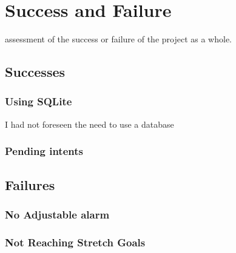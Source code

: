 \section{Success and Failure}\label{success-and-failure}

assessment of the success or failure of the project as a whole.

\subsection{Successes}\label{successes}

\subsubsection{Using SQLite}\label{using-sqlite}

I had not foreseen the need to use a database

\subsubsection{Pending intents}\label{pending-intents}

\subsection{Failures}\label{failures}

\subsubsection{No Adjustable alarm}\label{no-adjustable-alarm}

\subsubsection{Not Reaching Stretch
Goals}\label{not-reaching-stretch-goals}
